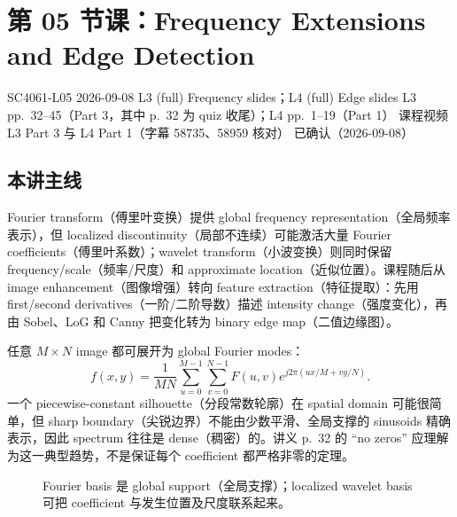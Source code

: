 
\section{第 05 节课：Frequency Extensions and Edge Detection}
\label{lecture:SC4061-L05}

\lecturemeta
  {SC4061-L05}
  {2026-09-08}
  {L3 (full) Frequency slides；L4 (full) Edge slides}
  {L3 pp.~32--45（Part 3，其中 p.~32 为 quiz 收尾）；L4 pp.~1--19（Part 1）}
  {课程视频 L3 Part 3 与 L4 Part 1（字幕 58735、58959 核对）}
  {已确认（2026-09-08）}

\subsection{本讲主线}

Fourier transform（傅里叶变换）提供 global frequency representation（全局频率表示），但 localized discontinuity（局部不连续）可能激活大量 Fourier coefficients（傅里叶系数）；wavelet transform（小波变换）则同时保留 frequency/scale（频率/尺度）和 approximate location（近似位置）。课程随后从 image enhancement（图像增强）转向 feature extraction（特征提取）：先用 first/second derivatives（一阶/二阶导数）描述 intensity change（强度变化），再由 Sobel、LoG 和 Canny 把变化转为 binary edge map（二值边缘图）。


任意 $M\times N$ image 都可展开为 global Fourier modes：
\[
  f(x,y)=\frac{1}{MN}\sum_{u=0}^{M-1}\sum_{v=0}^{N-1}
  F(u,v)e^{j2\pi(ux/M+vy/N)}.
\]
一个 piecewise-constant silhouette（分段常数轮廓）在 spatial domain 可能很简单，但 sharp boundary（尖锐边界）不能由少数平滑、全局支撑的 sinusoids 精确表示，因此 spectrum 往往是 dense（稠密）的。讲义 p.~32 的 ``no zeros'' 应理解为这一典型趋势，不是保证每个 coefficient 都严格非零的定理。

\begin{figure}[htbp]
  \centering
  \resizebox{0.95\textwidth}{!}{}
  \caption{Fourier basis 是 global support（全局支撑）；localized wavelet basis 可把 coefficient 与发生位置及尺度联系起来。}
  \label{fig:sc4061-l05-fourier-wavelet}
\end{figure}

